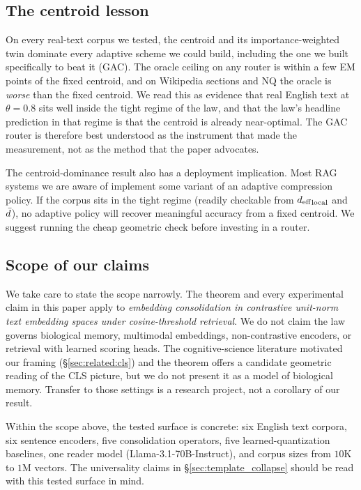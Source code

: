 \subsection{The centroid lesson}
\label{sec:disc:centroid}

On every real-text corpus we tested, the centroid and its
importance-weighted twin dominate every adaptive scheme we could
build, including the one we built specifically to beat it (GAC).
The oracle ceiling on any router is within a few EM points of the
fixed centroid, and on Wikipedia sections and NQ the oracle is
\emph{worse} than the fixed centroid. We read this as evidence that
real English text at $\theta = 0.8$ sits well inside the tight
regime of the law, and that the law's headline prediction in that
regime is that the centroid is already near-optimal. The GAC router
is therefore best understood as the instrument that made the
measurement, not as the method that the paper advocates.

The centroid-dominance result also has a deployment implication.
Most RAG systems we are aware of implement some variant of an
adaptive compression policy. If the corpus sits in the tight regime
(readily checkable from ${d_{\mathrm{eff}}}_{\mathrm{local}}$ and $\bar{d}$), no
adaptive policy will recover meaningful accuracy from a fixed
centroid. We suggest running the cheap geometric check before
investing in a router.

\subsection{Scope of our claims}
\label{sec:disc:scope}

We take care to state the scope narrowly. The theorem and every
experimental claim in this paper apply to \emph{embedding
consolidation in contrastive unit-norm text embedding spaces under
cosine-threshold retrieval}. We do not claim the law governs
biological memory, multimodal embeddings, non-contrastive encoders,
or retrieval with learned scoring heads. The cognitive-science
literature motivated our framing
(\S\ref{sec:related:cls}) and the theorem offers a candidate
geometric reading of the CLS picture, but we do not present it as a
model of biological memory. Transfer to those settings is a
research project, not a corollary of our result.

Within the scope above, the tested surface is concrete: six English
text corpora, six sentence encoders, five consolidation operators,
five learned-quantization baselines, one reader model
(Llama-3.1-70B-Instruct), and corpus sizes from $10$K to $1$M
vectors. The universality claims in \S\ref{sec:template_collapse}
should be read with this tested surface in mind.

